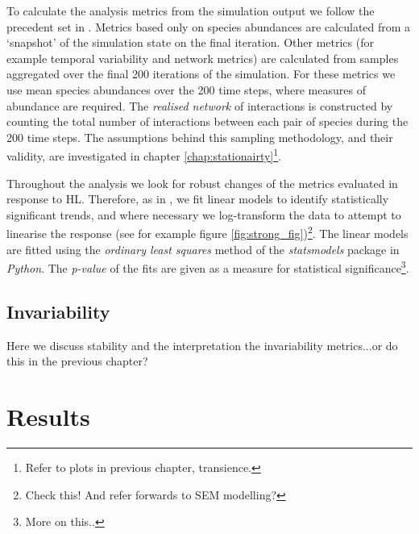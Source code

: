 To calculate the analysis metrics from the simulation output we follow the precedent set in \cite{lurgi2015effects}. Metrics based only on species abundances are calculated from a `snapshot' of the simulation state on the final iteration. Other metrics (for example temporal variability and network metrics) are calculated from samples aggregated over the final 200 iterations of the simulation. For these metrics we use mean species abundances over the 200 time steps, where measures of abundance are required. The \emph{realised network} of interactions is constructed by counting the total number of interactions between each pair of species during the 200 time steps. The assumptions behind this sampling methodology, and their validity, are investigated in chapter \ref{chap:stationairty}\footnote{Refer to plots in previous chapter, transience.}.

Throughout the analysis we look for robust changes of the metrics evaluated in response to HL. Therefore, as in \cite{lurgi2015effects}, we fit linear models to identify statistically significant trends, and where necessary we log-transform the data to attempt to linearise the response (see for example figure \ref{fig:strong_fig})\footnote{Check this! And refer forwards to SEM modelling?}. The linear models are fitted using the \emph{ordinary least squares} method of the \emph{statsmodels} package in \emph{Python}. The \emph{p-value} of the fits are given as a measure for statistical significance\footnote{More on this..}.

\subsection{Invariability}
\label{sec:stability}

Here we discuss stability and the interpretation the invariability metrics...or do this in the previous chapter?

\section{Results}
\label{sec:results}

